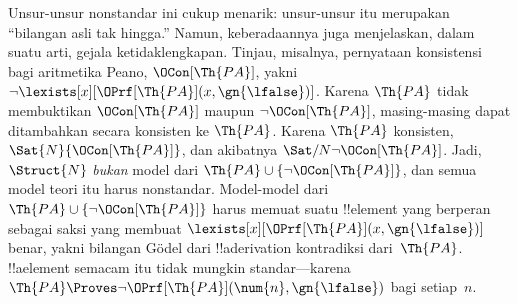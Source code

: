 \documentclass[../../../include/open-logic-section]{subfiles}
\begin{document}
Unsur-unsur nonstandar ini cukup menarik: unsur-unsur itu merupakan
``bilangan asli tak hingga.'' Namun, keberadaannya juga menjelaskan, dalam
suatu arti, gejala ketidaklengkapan. Tinjau, misalnya, pernyataan konsistensi
bagi aritmetika Peano, $\OCon[\Th{PA}]$, yakni $\lnot
\lexists[x][\OPrf[\Th{PA}](x, \gn{\lfalse})]$. Karena $\Th{PA}$ tidak
membuktikan $\OCon[\Th{PA}]$ maupun $\lnot \OCon[\Th{PA}]$, masing-masing
dapat ditambahkan secara konsisten ke $\Th{PA}$. Karena $\Th{PA}$
konsisten, $\Sat{N}{\OCon[\Th{PA}]}$, dan akibatnya
$\Sat/{N}{\lnot \OCon[\Th{PA}]}$. Jadi, $\Struct{N}$ \emph{bukan} model dari
$\Th{PA} \cup \{\lnot \OCon[\Th{PA}]\}$, dan semua model teori itu harus
nonstandar. Model-model dari $\Th{PA} \cup \{\lnot \OCon[\Th{PA}]\}$ harus
memuat suatu !!{element} yang berperan sebagai saksi yang membuat
$\lexists[x][\OPrf[\Th{PA}](x, \gn{\lfalse})]$ benar, yakni bilangan G\"odel
dari !!a{derivation} kontradiksi dari~$\Th{PA}$. !!a{element} semacam itu
tidak mungkin standar---karena $\Th{PA} \Proves \lnot
\OPrf[\Th{PA}](\num{n}, \gn{\lfalse})$ bagi setiap~$n$.
\end{document}
